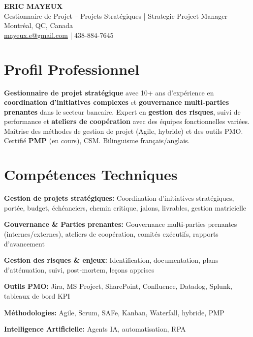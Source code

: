 \documentclass[11pt,a4paper]{article}
\begin{document}
\begin{center}
    {\LARGE \textbf{ERIC MAYEUX}}\\
    \vspace{4pt}
    {\large Gestionnaire de Projet -- Projets Stratégiques | Strategic Project Manager}\\
    \vspace{4pt}
    Montréal, QC, Canada\\
    \href{mailto:mayeux.e@gmail.com}{mayeux.e@gmail.com} | 438-884-7645
\end{center}

\vspace{8pt}

\section*{Profil Professionnel}
\noindent
\textbf{Gestionnaire de projet stratégique} avec 10+ ans d'expérience en \textbf{coordination d'initiatives complexes} et \textbf{gouvernance multi-parties prenantes} dans le secteur bancaire. Expert en \textbf{gestion des risques}, suivi de performance et \textbf{ateliers de coopération} avec des équipes fonctionnelles variées. Maîtrise des méthodes de gestion de projet (Agile, hybride) et des outils PMO. Certifié \textbf{PMP} (en cours), CSM. Bilinguisme français/anglais.

\section*{Compétences Techniques}

\textbf{Gestion de projets stratégiques:} Coordination d'initiatives stratégiques, portée, budget, échéanciers, chemin critique, jalons, livrables, gestion matricielle

\textbf{Gouvernance \& Parties prenantes:} Gouvernance multi-parties prenantes (internes/externes), ateliers de coopération, comités exécutifs, rapports d'avancement

\textbf{Gestion des risques \& enjeux:} Identification, documentation, plans d'atténuation, suivi, post-mortem, leçons apprises

\textbf{Outils PMO:} Jira, MS Project, SharePoint, Confluence, Datadog, Splunk, tableaux de bord KPI

\textbf{Méthodologies:} Agile, Scrum, SAFe, Kanban, Waterfall, hybride, PMP

\textbf{Intelligence Artificielle:} Agents IA, automatisation, RPA
\end{document}
